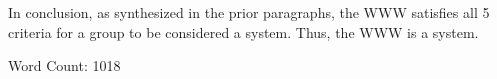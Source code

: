 \documentclass[11pt]{article}
\begin{document}
\par In conclusion, as synthesized in the prior paragraphs, the WWW satisfies all 5 criteria for a group to be considered a system. Thus, the WWW is a system.
\par
\par Word Count: 1018

































	





	








\end{document}
